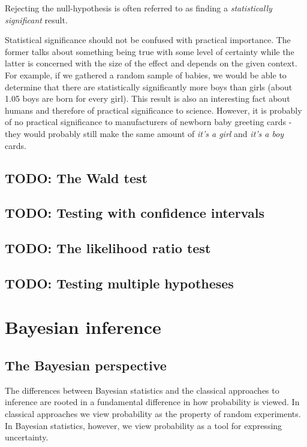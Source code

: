 \documentclass{book}
\theoremstyle{plain}%
\theoremstyle{definition}
\begin{document}
Rejecting the null-hypothesis is often referred to as finding a \emph{statistically significant} result.

Statistical significance should not be confused with practical importance. The former talks about something being true with some level of certainty while the latter is concerned with the size of the effect and depends on the given context. For example, if we gathered a random sample of babies, we would be able to determine that there are statistically significantly more boys than girls (about 1.05 boys are born for every girl). This result is also an interesting fact about humans and therefore of practical significance to science. However, it is probably of no practical significance to manufacturers of newborn baby greeting cards - they would probably still make the same amount of \emph{it's a girl} and \emph{it's a boy} cards.

\section{TODO: The Wald test}

\section{TODO: Testing with confidence intervals}

\section{TODO: The likelihood ratio test}

\section{TODO: Testing multiple hypotheses}


\chapter{Bayesian inference}\label{ch:bayes}

\section{The Bayesian perspective}

The differences between Bayesian statistics and the classical approaches to inference are rooted in a fundamental difference in how probability is viewed. In classical approaches we view probability as the property of random experiments. In Bayesian statistics, however, we view probability as a tool for expressing uncertainty.
\end{document}

